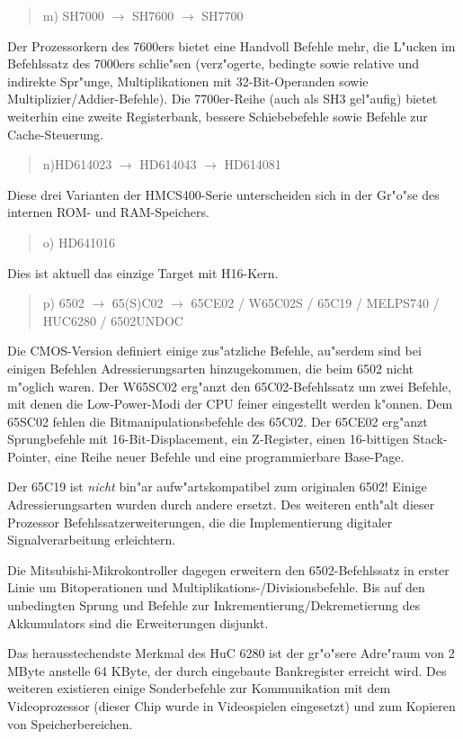 \documentclass[12pt,a4paper,twoside]{report}
\begin{document}
\begin{quote}
m) SH7000 $\longrightarrow$ SH7600 $\longrightarrow$ SH7700
\end{quote}
Der Prozessorkern des 7600ers bietet eine Handvoll Befehle mehr, die
L"ucken im Befehlssatz des 7000ers schlie"sen (verz"ogerte, bedingte
sowie relative und indirekte Spr"unge, Multiplikationen mit 32-Bit-Operanden
sowie Multiplizier/Addier-Befehle).  Die 7700er-Reihe (auch als SH3
gel"aufig) bietet weiterhin eine zweite Registerbank, bessere
Schiebebefehle sowie Befehle zur Cache-Steuerung.
\begin{quote}
n)HD614023 $\longrightarrow$ HD614043 $\longrightarrow$ HD614081
\end{quote}
Diese drei Varianten der HMCS400-Serie unterscheiden sich in der
Gr"o"se des internen ROM- und RAM-Speichers.
\begin{quote}
o) HD641016
\end{quote}
Dies ist aktuell das einzige Target mit H16-Kern.
\begin{quote}
p) 6502 $\rightarrow$ 65(S)C02 $\rightarrow$ 65CE02 / W65C02S /
   65C19 / MELPS740 / HUC6280 / 6502UNDOC
\end{quote}
Die CMOS-Version definiert einige zus"atzliche Befehle, au"serdem sind
bei einigen Befehlen Adressierungsarten hinzugekommen, die beim 6502
nicht m"oglich waren.  Der W65SC02 erg"anzt den
65C02-Befehlssatz um zwei Befehle, mit denen die Low-Power-Modi
der CPU feiner eingestellt werden k"onnen.  Dem 65SC02 fehlen die
Bitmanipulationsbefehle des 65C02.  Der 65CE02 erg"anzt Sprungbefehle
mit 16-Bit-Displacement, ein Z-Register, einen 16-bittigen Stack-Pointer,
eine Reihe neuer Befehle und eine programmierbare Base-Page.

Der 65C19 ist {\em nicht} bin"ar aufw"artskompatibel zum
originalen 6502!  Einige Adressierungsarten wurden durch andere
ersetzt.  Des weiteren enth"alt dieser Prozessor
Befehlssatzerweiterungen, die die Implementierung digitaler
Signalverarbeitung erleichtern.

Die Mitsubishi-Mikrokontroller dagegen erweitern den
6502-Befehlssatz in erster Linie um Bitoperationen und
Multiplikations-/Divisionsbefehle.  Bis auf den unbedingten Sprung und
Befehle zur Inkrementierung/Dekremetierung des Akkumulators sind die
Erweiterungen disjunkt.

Das herausstechendste Merkmal des HuC 6280 ist der gr"o"sere
Adre"raum von 2 MByte anstelle 64 KByte, der durch eingebaute
Bankregister erreicht wird.   Des weiteren existieren einige
Sonderbefehle zur Kommunikation mit dem Videoprozessor (dieser
Chip wurde in Videospielen eingesetzt) und zum Kopieren von
Speicherbereichen.
\end{document}
